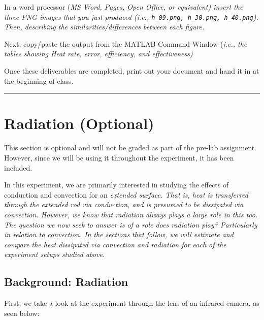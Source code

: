 \documentclass[11pt, letterpaper]{article}
\begin{document}
\begin{formal}
    \begin{deliv}  
In a word processor (\it{MS Word, Pages, Open Office, or equivalent}) insert the three PNG images that you just produced  (\it{i.e.,} \texttt{h\_09.png, h\_30.png, h\_40.png}).  Then,  describing the similarities/differences between each figure.
    \end{deliv}
\end{formal}

\begin{formal}
    \begin{deliv}  
Next, copy/paste the output from the MATLAB Command Window  (\it{i.e.,} the tables showing Heat rate, error, efficiency, and effectiveness)
    \end{deliv}
\end{formal}

Once these deliverables are completed, print out your document and hand it in at the beginning of class.

\n
\hrule

\section{Radiation (Optional)}

This section is optional and will not be graded as part of the pre-lab assignment. However, since we will be using it throughout the experiment, it has been included.
\n

In this experiment, we are primarily interested in studying the effects of conduction and convection for an \it{extended surface}. That is, heat is transferred through the extended rod via conduction, and is presumed to be dissipated via convection. However, we know that radiation always plays a large role in this too. The question we now seek to answer is  of a role does radiation play? Particularly in relation to \it{convection}. In the sections that follow, we will estimate and compare the heat dissipated via convection and radiation for each of the experiment setups studied above.

\n
\subsection{Background: Radiation}

First, we take a look at the experiment through the lens of an infrared camera, as seen below:
\end{document}
